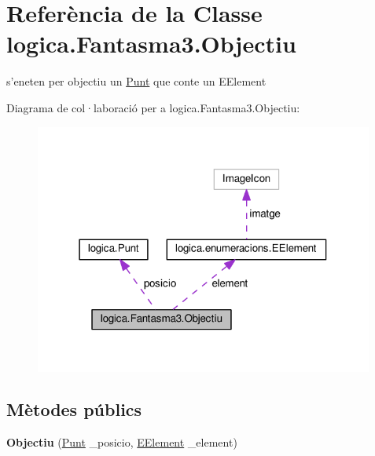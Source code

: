 \hypertarget{classlogica_1_1_fantasma3_1_1_objectiu}{\section{Referència de la Classe logica.\+Fantasma3.\+Objectiu}
\label{classlogica_1_1_fantasma3_1_1_objectiu}
}


s'eneten per objectiu un \hyperlink{classlogica_1_1_punt}{Punt} que conte un E\+Element  




Diagrama de col·laboració per a logica.\+Fantasma3.\+Objectiu\+:
\nopagebreak
\begin{figure}[H]
\begin{center}
\leavevmode
\includegraphics[width=316pt]{classlogica_1_1_fantasma3_1_1_objectiu__coll__graph}
\end{center}
\end{figure}
\subsection*{Mètodes públics}
\begin{DoxyCompactItemize}
\item 
\hypertarget{classlogica_1_1_fantasma3_1_1_objectiu_a5944f2d78acfcec621bda0ef2133048a}{{\bfseries Objectiu} (\hyperlink{classlogica_1_1_punt}{Punt} \+\_\+posicio, \hyperlink{enumlogica_1_1enumeracions_1_1_e_element}{E\+Element} \+\_\+element)}\label{classlogica_1_1_fantasma3_1_1_objectiu_a5944f2d78acfcec621bda0ef2133048a}

\end{DoxyCompactItemize}
